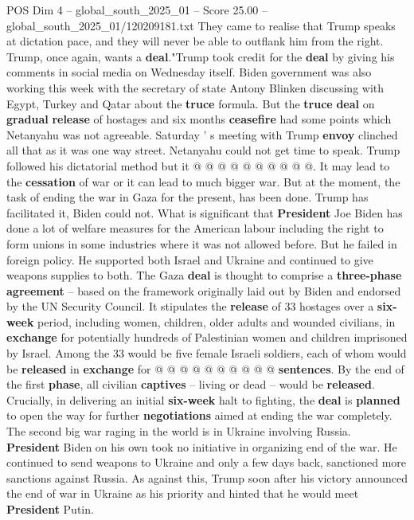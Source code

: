 \begin{textsample}{POS Dim 4 – global\_south\_2025\_01 – Score 25.00 – global\_south\_2025\_01/120209181.txt}
They came to realise that Trump speaks at dictation pace, and they will never be able to outflank him from the right.
Trump, once again, wants a \textbf{deal}."Trump took credit for the \textbf{deal} by giving his comments in social media on Wednesday itself.
Biden government was also working this week with the secretary of state Antony Blinken discussing with Egypt, Turkey and Qatar about the \textbf{truce} formula.
But the \textbf{truce} \textbf{deal} on \textbf{gradual} \textbf{release} of hostages and six months \textbf{ceasefire} had some points which Netanyahu was not agreeable.
Saturday ' s meeting with Trump \textbf{envoy} clinched all that as it was one way street.
Netanyahu could not get time to speak.
Trump followed his dictatorial method but it @ @ @ @ @ @ @ @ @ @.
It may lead to the \textbf{cessation} of war or it can lead to much bigger war.
But at the moment, the task of ending the war in Gaza for the present, has been done.
Trump has facilitated it, Biden could not.
What is significant that \textbf{President} Joe Biden has done a lot of welfare measures for the American labour including the right to form unions in some industries where it was not allowed before.
But he failed in foreign policy.
He supported both Israel and Ukraine and continued to give weapons supplies to both.
The Gaza \textbf{deal} is thought to comprise a \textbf{three-phase} \textbf{agreement} -- based on the framework originally laid out by Biden and endorsed by the UN Security Council.
It stipulates the \textbf{release} of 33 hostages over a \textbf{six-week} period, including women, children, older adults and wounded civilians, in \textbf{exchange} for potentially hundreds of Palestinian women and children imprisoned by Israel.
Among the 33 would be five female Israeli soldiers, each of whom would be \textbf{released} in \textbf{exchange} for @ @ @ @ @ @ @ @ @ @ \textbf{sentences}.
By the end of the first \textbf{phase}, all civilian \textbf{captives} -- living or dead -- would be \textbf{released}.
Crucially, in delivering an initial \textbf{six-week} halt to fighting, the \textbf{deal} is \textbf{planned} to open the way for further \textbf{negotiations} aimed at ending the war completely.
The second big war raging in the world is in Ukraine involving Russia. \textbf{President} Biden on his own took no initiative in organizing end of the war.
He continued to send weapons to Ukraine and only a few days back, sanctioned more sanctions against Russia.
As against this, Trump soon after his victory announced the end of war in Ukraine as his priority and hinted that he would meet \textbf{President} Putin.

\end{textsample}
